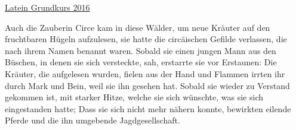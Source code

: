 \documentclass[12pt,a4paper]{article}
\begin{document}
    \setlength{\parindent}{0mm}
    \setcounter{tocdepth}{4}
    \pagestyle{empty}

    \begin{center}
        \underline{\LARGE Latein Grundkurs 2016}
    \end{center}

    \bigskip
    Auch die Zauberin Circe kam in diese Wälder, um neue Kräuter auf den fruchtbaren Hügeln aufzulesen, sie hatte die
    circäischen Gefilde verlassen, die nach ihrem Namen benannt waren.
    Sobald sie einen jungen Mann aus den Büschen, in denen sie sich versteckte, sah, erstarrte sie vor Erstaunen:
    Die Kräuter, die aufgelesen wurden, fielen aus der Hand und Flammen irrten ihr durch Mark und Bein, weil sie ihn gesehen hat.
    Sobald sie wieder zu Verstand gekommen ist, mit starker Hitze, welche sie sich wünschte, was sie sich eingestanden hatte;
    Dass sie sich nicht mehr nähern konnte, bewirkten eilende Pferde und die ihn umgebende Jagdgesellschaft.
\end{document}
